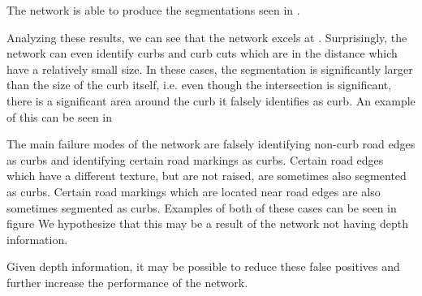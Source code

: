 The network is able to produce the segmentations seen in .

Analyzing these results, we can see that the network excels at .
Surprisingly, the network can even identify curbs and curb cuts which are in the distance which have a relatively small size.
In these cases, the segmentation is significantly larger than the size of the curb itself, i.e. even though the intersection is significant, there is a significant area around the curb it falsely identifies as curb.
An example of this can be seen in 

The main failure modes of the network are falsely identifying non-curb road edges as curbs and identifying certain road markings as curbs.
Certain road edges which have a different texture, but are not raised, are sometimes also segmented as curbs.
Certain road markings which are located near road edges are also sometimes segmented as curbs.
Examples of both of these cases can be seen in figure 
We hypothesize that this may be a result of the network not having depth information.

Given depth information, it may be possible to reduce these false positives and further increase the performance of the network.
